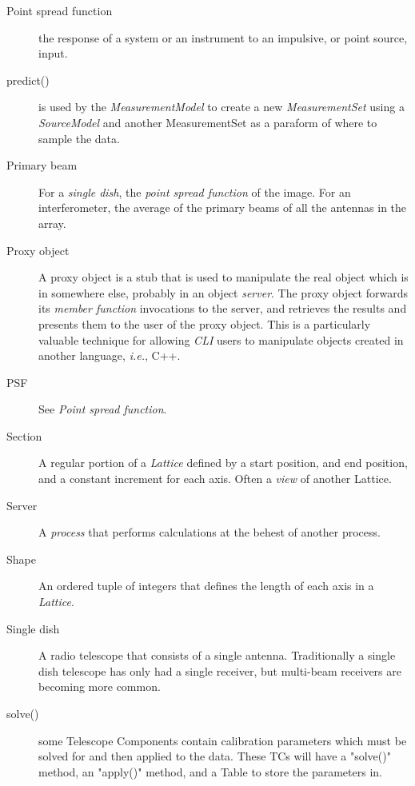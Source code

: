 \begin{description}
\item[Point spread function]
the response of a system or an instrument to an impulsive,
or point source, input.


\item[predict()] is used by the {\em MeasurementModel} to create a new
{\em MeasurementSet} using a {\em SourceModel} and another
MeasurementSet as a paraform of where to sample the data.


\item[Primary beam]
For a {\em single dish}, the {\em point spread function} of the
image. For an interferometer, the average of the primary beams of all
the antennas in the array.



\item[Proxy object]
A proxy object is a stub that is used to manipulate the real object
which is in somewhere else, probably in an object {\em server}. The
proxy object forwards its {\em member function} invocations to the
server, and retrieves the results and presents them to the user of the
proxy object. This is a particularly valuable technique for allowing
{\em CLI} users to manipulate objects created in another language,
{\em i.e.}, C++.

\item[PSF] See {\em Point spread function}.


\item[Section] A regular portion of a {\em Lattice} defined by a start
position, and end position, and a constant increment for each
axis. Often a {\em view} of another Lattice.

\item[Server] A {\em process} that performs calculations at the behest
of another process.


\item[Shape] An ordered tuple of integers that defines the length of
each axis in a {\em Lattice}.


\item[Single dish] A radio telescope that consists of a single
antenna. Traditionally a single dish telescope has only had a single
receiver, but multi-beam receivers are becoming more common.


\item[solve()] some Telescope Components contain calibration parameters which
must be solved for and then applied to the data.  These TCs will have
a "solve()" method, an "apply()" method, and a Table to store the
parameters in.



\end{description}
